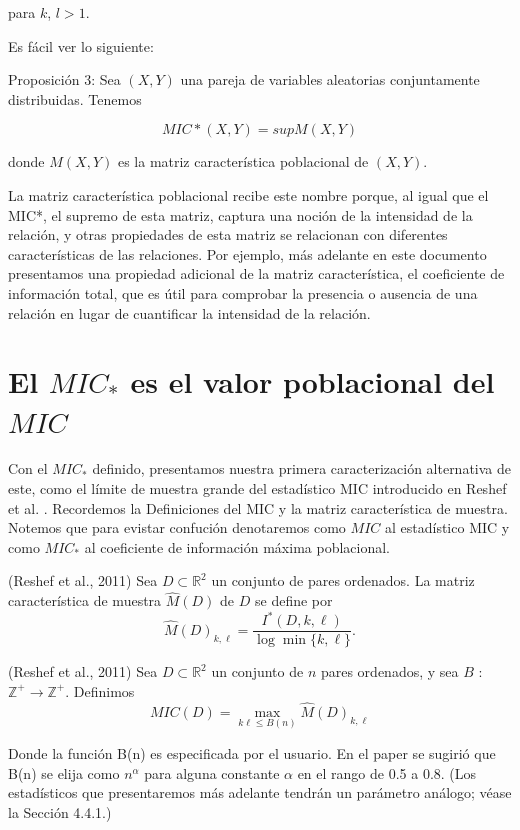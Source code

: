 	para $k$, $l > 1$.
	
	Es f\'acil ver lo siguiente:

	
	Proposici\'on 3: Sea $(X,Y)$ una pareja de variables aleatorias conjuntamente distribuidas. Tenemos
	
	$$MIC*(X,Y) = sup M(X,Y)$$
	
	donde $M(X,Y)$ es la matriz caracter\'istica poblacional de $(X,Y)$.
	
	La matriz caracter\'istica poblacional recibe este nombre porque, al igual que el MIC*, el supremo de esta matriz, captura una noci\'on de la intensidad de la relaci\'on, y otras propiedades de esta matriz se relacionan con diferentes caracter\'isticas de las relaciones. Por ejemplo, m\'as adelante en este documento presentamos una propiedad adicional de la matriz caracter\'istica, el coeficiente de informaci\'on total, que es \'util para comprobar la presencia o ausencia de una relaci\'on en lugar de cuantificar la intensidad de la relaci\'on.

	\section[short]{El $MIC_*$ es el valor poblacional del $MIC$}

	Con el $MIC_*$ definido, presentamos nuestra primera caracterizaci\'on alternativa de este, como el l\'imite de muestra grande del estad\'istico MIC introducido en Reshef et al. \cite{Reshef2011}. Recordemos la Definiciones del MIC y la matriz caracter\'istica de muestra. Notemos que para evistar confuci\'on denotaremos como $MIC$ al estad\'istico MIC y como $MIC_*$ al coeficiente de informaci\'on m\'axima poblacional.

	\begin{defn}
		(Reshef et al., 2011)  Sea $D \subset \mathbb{R}^2$ un conjunto de pares ordenados. La matriz caracter\'istica de muestra $\widehat{M}(D)$ de $D$ se define por
		$$
		\widehat{M}(D)_{k, \ell}=\frac{I^*(D, k, \ell)}{\log \min \{k, \ell\}} .
		$$
	\end{defn}

	\begin{defn}
		(Reshef et al., 2011) Sea $D \subset \mathbb{R}^2$ un conjunto de $n$ pares ordenados, y sea $B$ : $\mathbb{Z}^{+} \rightarrow \mathbb{Z}^{+}$. Definimos
		$$
		M I C(D)=\max _{k \ell \leq B(n)} \widehat{M}(D)_{k, \ell}
		$$
	\end{defn}

	Donde la funci\'on B(n) es especificada por el usuario. En el paper se sugiri\'o que B(n) se elija como $n^\alpha$ para alguna constante $\alpha$ en el rango de 0.5 a 0.8. (Los estad\'isticos que presentaremos m\'as adelante tendr\'an un par\'ametro an\'alogo; v\'ease la Secci\'on 4.4.1.)

